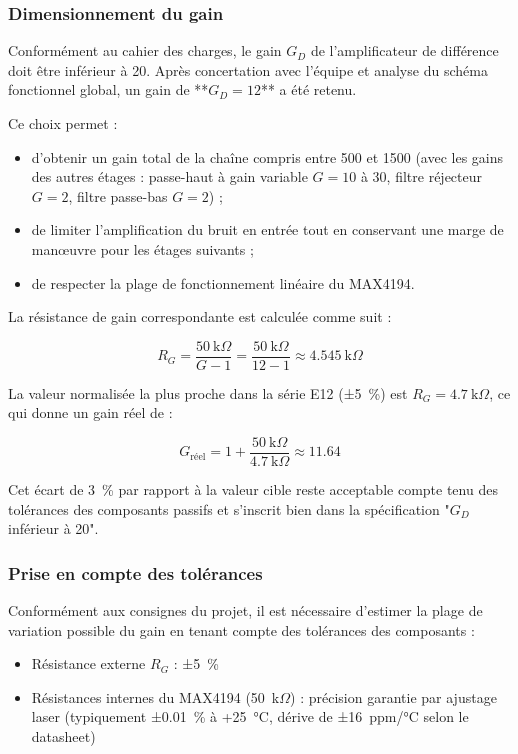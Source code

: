 \documentclass{article}
\begin{document}
\subsubsection{Dimensionnement du gain}

Conformément au cahier des charges, le gain $G_D$ de l'amplificateur de différence doit être inférieur à 20. Après concertation avec l'équipe et analyse du schéma fonctionnel global, un gain de **$G_D = 12$** a été retenu.

Ce choix permet :
\begin{itemize}
    \item d'obtenir un gain total de la chaîne compris entre 500 et 1500 (avec les gains des autres étages : passe-haut à gain variable $G = 10$ à 30, filtre réjecteur $G = 2$, filtre passe-bas $G = 2$) ;
    \item de limiter l'amplification du bruit en entrée tout en conservant une marge de manœuvre pour les étages suivants ;
    \item de respecter la plage de fonctionnement linéaire du MAX4194.
\end{itemize}

La résistance de gain correspondante est calculée comme suit :

\[
R_G = \frac{50~\text{k}\Omega}{G - 1} = \frac{50~\text{k}\Omega}{12 - 1} \approx 4.545~\text{k}\Omega
\]

La valeur normalisée la plus proche dans la série E12 (±5~\%) est $R_G = 4.7~\text{k}\Omega$, ce qui donne un gain réel de :

\[
G_{\text{réel}} = 1 + \frac{50~\text{k}\Omega}{4.7~\text{k}\Omega} \approx 11.64
\]

Cet écart de 3~\% par rapport à la valeur cible reste acceptable compte tenu des tolérances des composants passifs et s'inscrit bien dans la spécification "$G_D$ inférieur à 20".

\subsubsection{Prise en compte des tolérances}

Conformément aux consignes du projet, il est nécessaire d'estimer la plage de variation possible du gain en tenant compte des tolérances des composants :

\begin{itemize}
    \item Résistance externe $R_G$ : ±5~\%
    \item Résistances internes du MAX4194 (50~k$\Omega$) : précision garantie par ajustage laser (typiquement ±0.01~\% à +25~°C, dérive de ±16~ppm/°C selon le datasheet)
\end{itemize}
\end{document}
